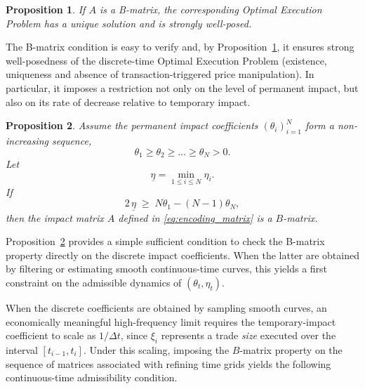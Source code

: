 \documentclass[final,3p,authoryear,12pt]{elsarticle}
\newtheorem{proposition}{Proposition}
\begin{document}

\begin{proposition}
\label{proposition:BmatrixNoTTPM}
    If $A$ is a B-matrix, the corresponding Optimal Execution Problem has a unique solution and is strongly well-posed.
\end{proposition}


The B-matrix condition is easy to verify and, by
Proposition~\ref{proposition:BmatrixNoTTPM}, it ensures strong well-posedness
of the discrete-time Optimal Execution Problem (existence, uniqueness and
absence of transaction-triggered price manipulation). In particular, it
imposes a restriction not only on the level of permanent impact, but also
on its rate of decrease relative to temporary impact.
\begin{proposition}
\label{proposition:_ct_limit_for_dt_model}
Assume the permanent impact coefficients $(\theta_i)_{i=1}^N$ form a
non-increasing sequence,
\[
\theta_1 \ge \theta_2 \ge \dots \ge \theta_N>0.
\]
Let
\[
\underline\eta = \min_{1\le i\le N} \eta_i.
\]
If
\begin{equation}
\label{inequality:BmatRestrictive}
2\,\underline\eta \;\ge\; N\theta_1 - (N-1)\theta_N,
\end{equation}
then the impact matrix $A$ defined in \eqref{eq:encoding_matrix} is a
$B$-matrix.
\end{proposition}
Proposition~\ref{proposition:_ct_limit_for_dt_model} provides a simple
sufficient condition to check the B-matrix property directly on the discrete
impact coefficients. When the latter are obtained by filtering or estimating smooth
continuous-time curves, this yields a first constraint on the admissible
dynamics of $(\theta_t,\eta_t)$.

When the discrete coefficients are obtained by sampling smooth curves, an
economically meaningful high-frequency limit requires the temporary-impact
coefficient to scale as $1/\Delta t$, since $\xi_i$ represents a trade \emph{size}
executed over the interval $[t_{i-1},t_i]$. Under this scaling, imposing the
$B$-matrix property on the sequence of matrices associated with refining time
grids yields the following continuous-time admissibility condition.
\end{document}
